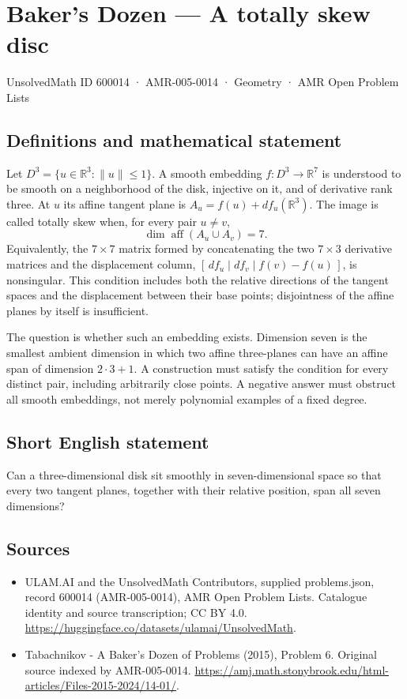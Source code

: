 \documentclass[11pt,a4paper]{article}
\begin{document}
\section*{Baker's Dozen — A totally skew disc}\label{600014}
{\small UnsolvedMath ID 600014 · AMR-005-0014 · Geometry · AMR Open Problem Lists}
\subsection{Definitions and mathematical statement}
Let $D^3=\{u\in\mathbb R^3:\|u\|\le1\}$. A smooth embedding
$f:D^3\to\mathbb R^7$ is understood to be smooth on a neighborhood of the
disk, injective on it, and of derivative rank three. At $u$ its affine tangent
plane is
$A_u=f(u)+df_u(\mathbb R^3)$.
The image is called totally skew when, for every pair $u\ne v$,
\[
 \dim\operatorname{aff}(A_u\cup A_v)=7.
\]
Equivalently, the $7\times7$ matrix formed by concatenating the two
$7\times3$ derivative matrices and the displacement column,
$[\,df_u\mid df_v\mid f(v)-f(u)\,]$, is nonsingular. This condition includes both the relative
directions of the tangent spaces and the displacement between their base
points; disjointness of the affine planes by itself is insufficient.

The question is whether such an embedding exists. Dimension seven is the
smallest ambient dimension in which two affine three-planes can have an
affine span of dimension $2\cdot3+1$. A construction must satisfy the
condition for every distinct pair, including arbitrarily close points.
A negative answer must obstruct all smooth embeddings, not merely
polynomial examples of a fixed degree.
\subsection{Short English statement}
Can a three-dimensional disk sit smoothly in seven-dimensional space so
that every two tangent planes, together with their relative position, span
all seven dimensions?
\subsection{Sources}
\begin{itemize}
\item[S1] ULAM.AI and the UnsolvedMath Contributors, supplied problems.json, record 600014 (AMR-005-0014), AMR Open Problem Lists. Catalogue identity and source transcription; CC BY 4.0.
\url{https://huggingface.co/datasets/ulamai/UnsolvedMath}.
\item[S2] Tabachnikov - A Baker's Dozen of Problems (2015), Problem 6. Original source indexed by AMR-005-0014.
\url{https://amj.math.stonybrook.edu/html-articles/Files-2015-2024/14-01/}.
\end{itemize}
\end{document}
